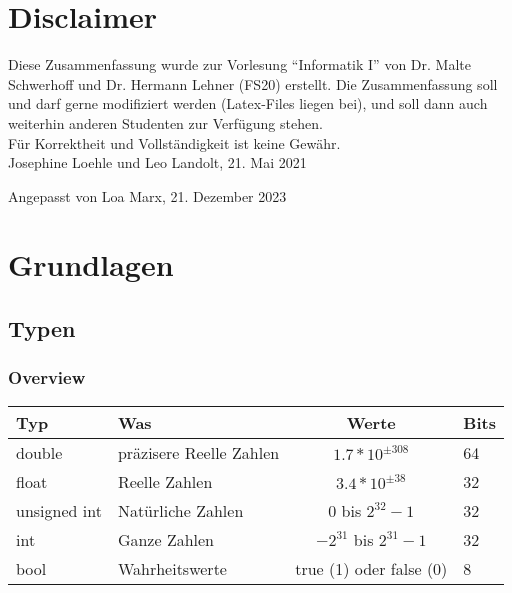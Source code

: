 \documentclass[a3paper, 10pt, landscape]{scrartcl}
\begin{document}
	\begin{multicols*}{3}
	
	
\section*{Disclaimer}
    \vspace{0.2cm}
    Diese Zusammenfassung wurde zur Vorlesung "`Informatik I"' von Dr. Malte Schwerhoff und Dr. Hermann Lehner (FS20) erstellt. Die Zusammenfassung soll und darf gerne modifiziert werden (Latex-Files liegen bei), und soll dann auch weiterhin anderen Studenten zur Verfügung stehen. \\
			
    Für Korrektheit und Vollständigkeit ist keine Gewähr.\\
			
    Josephine Loehle und Leo Landolt, 21. Mai 2021

    Angepasst von Loa Marx, 21. Dezember 2023
    \vfill\null
\pagebreak
	
\section{Grundlagen}

	\subsection{Typen}
	
		\subsubsection{Overview}
		\vspace{0.1cm}
		
		\begin{tabular} {l l c l}
			\textbf{Typ} & \textbf{Was} & \textbf{Werte} & \textbf{Bits} \\
			\hline
			double & präzisere Reelle Zahlen & $1.7*10^{\pm308}$ & 64 \\
			float & Reelle Zahlen & $3.4*10^{\pm38}$ & 32\\
			unsigned int & Natürliche Zahlen & 0 bis $ 2^{32}-1$ & 32\\
			int & Ganze Zahlen & $-2^{31}$ bis $2^{31}-1$ & 32\\
			
			bool & Wahrheitswerte & true (1) oder false (0) & 8\\
			\hline
			

\end{tabular}
\end{multicols*}
\end{document}

